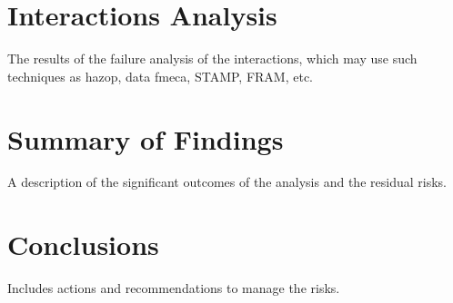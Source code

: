 \section{Interactions Analysis}
The results of the failure analysis of the interactions, which may use such techniques as \gls{hazop}, data \gls{fmeca}, STAMP, FRAM, etc.
\section{Summary of Findings}
A description of the significant outcomes of the analysis and the residual risks.
\section{Conclusions}
Includes actions and recommendations to manage the risks.
